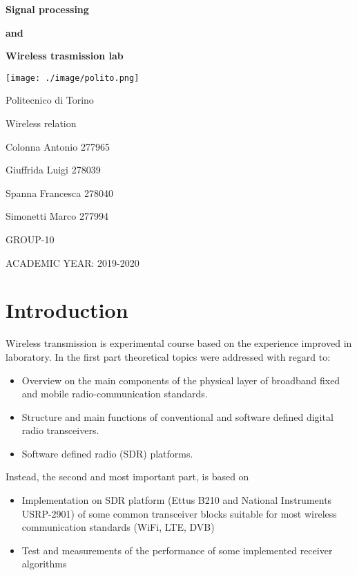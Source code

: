 \documentclass[12pt,  english, makeidx, a4paper, titlepage, oneside]{article}
\begin{document}
\begin{titlepage}
\centerline{\Large\textbf{Signal processing} }
\vspace{0.3cm}
\centerline{\Large\textbf{and} }
\vspace{0.3cm}
\centerline{\Large\textbf{Wireless trasmission lab} }
\bigskip
\bigskip
\bigskip
\centerline{
\texttt{[image: ./image/polito.png]}}  
\vspace{1cm}
\centerline{\LARGE Politecnico di Torino}
\vspace{2cm}
\centerline{\Huge\sf Wireless relation }
\bigskip
\bigskip

\vspace{2cm}
\centerline{\Large Colonna Antonio 277965}
\vspace{0.5cm}
\centerline{\Large  Giuffrida Luigi 278039 }
\vspace{0.5cm}
\centerline{\Large Spanna Francesca 278040}
\vspace{0.5cm}
\centerline{\Large Simonetti Marco 277994}
\vspace{0.5cm}
\centerline{\Large GROUP-10}
\vspace{3.25cm}
\centerline{\Large ACADEMIC YEAR: 2019-2020}
\end{titlepage}

\tableofcontents

\pagebreak

\section{Introduction}
Wireless transmission is experimental course based on the experience improved in laboratory.
In the first part theoretical topics were addressed with regard to:
\begin{itemize}
\item Overview on the main components of the physical layer of broadband fixed and mobile radio-communication standards.
\item Structure and main functions of conventional and software defined digital radio transceivers.
\item Software defined radio (SDR) platforms.
\end{itemize}

Instead, the second and most important part, is based on
\begin{itemize}
\item Implementation on SDR platform (Ettus B210 and National Instruments USRP-2901) of some common transceiver blocks suitable for most wireless communication standards (WiFi, LTE, DVB)
\item Test and measurements of the performance of some implemented receiver algorithms
\end{itemize}
\end{document}
